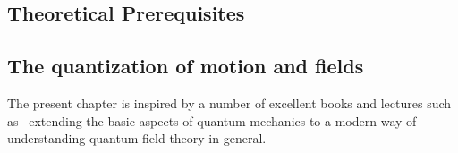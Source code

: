 \documentclass{svmono}
\begin{document}
\clearpage{}

\begin{partbacktext}
    \part{Theoretical Prerequisites}
    \label{part:theory}
\end{partbacktext}
\clearpage{}
\clearpage{}\chapter{The quantization of motion and fields}
\label{ch:the_quantization_of_motion_and_fields}
The present chapter is inspired by a number of excellent books and lectures such as~\cite{AshcroftMermin1978,AltlandSimons2010,BruusFlensberg2004,Czycholl2016,FetterWalecka2003,Giamarchi2003,Rizzi2016,Burrello2020} extending the basic aspects of quantum mechanics to a modern way of understanding quantum field theory in general.
\end{document}
